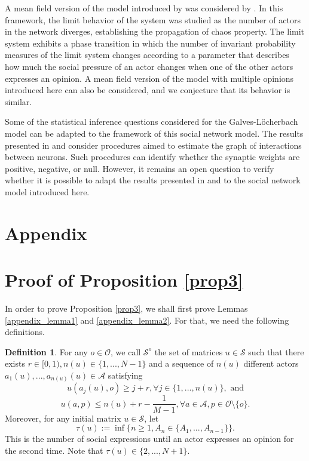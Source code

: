\documentclass[11pt]{article}
\theoremstyle{definition}
\newtheorem{definition}{Definition}
\newcommand{\st}{\mathcal{S}}
\begin{document}
A mean field version of the model introduced by \cite{galves2024fastconsensusmetastabilityhighly} was considered by \cite{evalaxa}. In this framework, the limit behavior of the system was studied as the number of actors in the network diverges, establishing the propagation of chaos property. The limit system exhibits a phase transition in which the number of invariant probability measures of the limit system changes according to a parameter that describes how much the social pressure of an actor changes when one of the other actors expresses an opinion.
A mean field version of the model with multiple opinions introduced here can also be considered, and we conjecture that its behavior is similar.

Some of the statistical inference questions considered for the Galves-Löcherbach model can be adapted to the framework of this social network model. The results presented in \cite{ostduarte3} and \cite{desantis} consider procedures aimed to estimate the graph of interactions between neurons. Such procedures can identify whether the synaptic weights are positive, negative, or null. However, it remains an open question to verify whether it is possible to adapt the results presented in \cite{ostduarte3} and \cite{desantis} to the social network model introduced here.

\newpage
\appendix

\section*{Appendix}

\section{Proof of Proposition \ref{prop3}}\label{appendix1}

In order to prove Proposition \ref{prop3}, we shall first prove Lemmas \ref{appendix_lemma1} and \ref{appendix_lemma2}. For that, we need the following definitions.

\begin{definition}
 For any $o\in\mathcal{O}$, we call $\st^o$ the set of matrices $u\in\st$ such that there exists $r\in [0,1), n(u)\in\{1,...,N-1\}$ and a sequence of $n(u)$ different actors $a_1(u),...,a_{n(u)}(u)\in\mathcal{A}$ satisfying
        $$
            u(a_j(u),o)\geq j+r, \forall j \in\{1,...,n(u)\},\text{ and}
        $$
        $$
            u(a,p)\leq n(u)+r-\frac{1}{M-1}, \forall a\in\mathcal{A},p\in\mathcal{O}\setminus\{o\}.
        $$    
Moreover, for any initial matrix $u\in\st$, let
        $$
            \tau(u):=\inf\{n\geq 1, A_n\in\{A_1,...,A_{n-1}\}\}.
        $$
        This is the number of social expressions until an actor expresses an opinion for the second time. Note that $\tau(u)\in\{2, ..., N+1\}$.
\end{definition}
\end{document}
